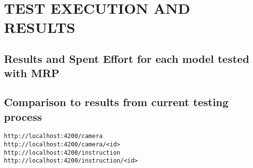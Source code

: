 \chapter{TEST EXECUTION AND RESULTS}
\label{chapter:testing_results}



\section{Results and Spent Effort for each model tested with MRP}

\section{Comparison to results from current testing process}





\begin{lstlisting}
http://localhost:4200/camera
http://localhost:4200/camera/<id>
http://localhost:4200/instruction
http://localhost:4200/instruction/<id>
\end{lstlisting}

